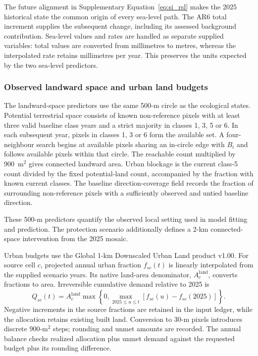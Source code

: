 The future alignment in Supplementary Equation~\eqref{eq:si_rsl} makes the 2025 historical state the common origin of every sea-level path. The AR6 total increment supplies the subsequent change, including its assessed background contribution. Sea-level values and rates are handled as separate supplied variables: total values are converted from millimetres to metres, whereas the interpolated rate retains millimetres per year. This preserves the units expected by the two sea-level predictors.

\subsubsection{Observed landward space and urban land budgets}
The landward-space predictors use the same 500-m circle as the ecological states. Potential terrestrial space consists of known non-reference pixels with at least three valid baseline class years and a strict majority in classes 1, 3, 5 or 6. In each subsequent year, pixels in classes 1, 3 or 6 form the available set. A four-neighbour search begins at available pixels sharing an in-circle edge with $B_i$ and follows available pixels within that circle. The reachable count multiplied by 900~m$^2$ gives connected landward area. Urban blockage is the current class-5 count divided by the fixed potential-land count, accompanied by the fraction with known current classes. The baseline direction-coverage field records the fraction of surrounding non-reference pixels with a sufficiently observed and untied baseline direction.

These 500-m predictors quantify the observed local setting used in model fitting and prediction. The protection scenario additionally defines a 2-km connected-space intervention from the 2025 mosaic. 

Urban budgets use the Global 1-km Downscaled Urban Land product v1.00\cite{ref051,GaoUrbanData}. For source cell $c$, projected annual urban fraction $f_{sc}(t)$ is linearly interpolated from the supplied scenario years. Its native land-area denominator, $A_c^{\mathrm{land}}$, converts fractions to area. Irreversible cumulative demand relative to 2025 is
\begin{equation}\label{eq:si_budget}
Q_{sc}(t)=A_c^{\mathrm{land}}\max\left\{0,\max_{2025\leq u\leq t}[f_{sc}(u)-f_{sc}(2025)]\right\}.
\end{equation}
Negative increments in the source fractions are retained in the input ledger, while the allocation retains existing built land. Conversion to 30-m pixels introduces discrete 900-m$^2$ steps; rounding and unmet amounts are recorded. The annual balance checks realized allocation plus unmet demand against the requested budget plus its rounding difference.

